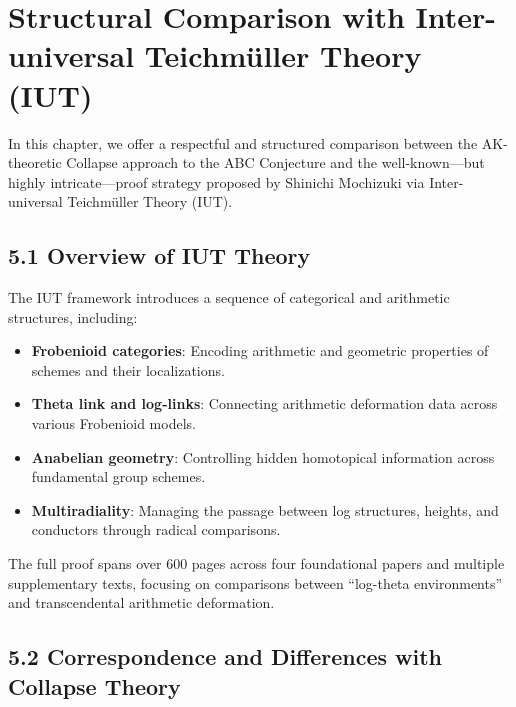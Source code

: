 \documentclass[11pt]{article}
\begin{document}
\section{Structural Comparison with Inter-universal Teichmüller Theory (IUT)}

In this chapter, we offer a respectful and structured comparison between the AK-theoretic Collapse approach to the ABC Conjecture and the well-known—but highly intricate—proof strategy proposed by Shinichi Mochizuki via Inter-universal Teichmüller Theory (IUT).

\subsection{5.1 Overview of IUT Theory}

The IUT framework introduces a sequence of categorical and arithmetic structures, including:
\begin{itemize}
    \item \textbf{Frobenioid categories}: Encoding arithmetic and geometric properties of schemes and their localizations.
    \item \textbf{Theta link and log-links}: Connecting arithmetic deformation data across various Frobenioid models.
    \item \textbf{Anabelian geometry}: Controlling hidden homotopical information across fundamental group schemes.
    \item \textbf{Multiradiality}: Managing the passage between log structures, heights, and conductors through radical comparisons.
\end{itemize}

The full proof spans over 600 pages across four foundational papers and multiple supplementary texts, focusing on comparisons between “log-theta environments” and transcendental arithmetic deformation.

\subsection{5.2 Correspondence and Differences with Collapse Theory}
\end{document}
